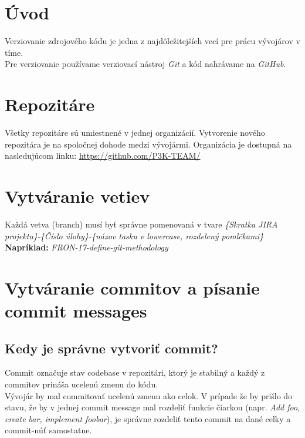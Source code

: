 \documentclass{article}
\begin{document}
    

    \section*{Úvod}
        \textnormal{%
        Verziovanie zdrojového kódu je jedna z najdôležitejších vecí pre prácu vývojárov v tíme. \\
        Pre verziovanie používame verziovací nástroj \emph{Git} a kód nahrávame na \emph{GitHub}.
        }

    \section*{Repozitáre}

        \textnormal{%
        Všetky repozitáre sú umiestnené v jednej organizácií. Vytvorenie nového repozitára je na spoločnej dohode medzi vývojármi.
        Organizácia je dostupná na nasledujúcom linku: \href{https://github.com/P3K-TEAM/}{https://github.com/P3K-TEAM/}
        }

    \section*{Vytváranie vetiev}

        \textnormal{Každá vetva (branch) musí byť správne pomenovaná v tvare \emph{\{Skratka JIRA projektu\}-\{Číslo úlohy\}-\{názov tasku v lowercase, rozdelený pomlčkami\}}} \\
        \smallskip
        \textbf{Napríklad:} \emph{FRON-17-define-git-methodology}

    \section*{Vytváranie commitov a písanie commit messages}

        \vspace*{.25cm}
        \subsection*{Kedy je správne vytvoriť commit?}

            \textnormal{%
            Commit označuje stav codebase v repozitári, ktorý je stabilný a každý z commitov prináša ucelenú zmenu do kódu. \\
            Vývojár by mal commitovať ucelenú zmenu ako celok. V prípade že by prišlo do stavu, že by v jednej commit message mal rozdeliť funkcie čiarkou (napr. \emph{Add foo, create bar, implement foobar}), je správne rozdeliť tento commit na dané celky a commit-núť samostatne. \\
            }
\end{document}
